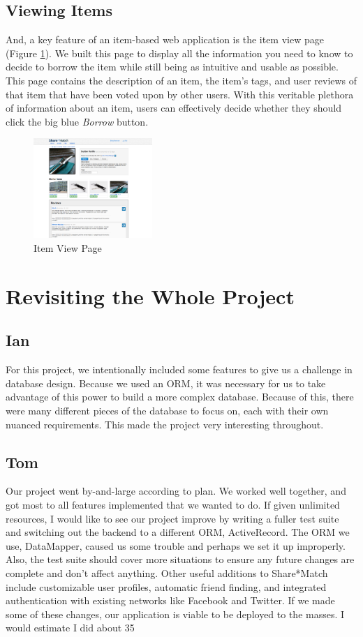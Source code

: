 \documentclass{acm_proc_article-sp}
\begin{document}
\subsection{Viewing Items}
And, a key feature of an item-based web application is the item view page (Figure \ref{fig:ItemView.png}). 
We built this page to display all the information
you need to know to decide to borrow the item while still being as intuitive and usable as possible. This page contains
the description of an item, the item's tags, and user reviews of that item that have been voted upon by other users.
With this veritable plethora of information about an item, users can effectively decide whether they should click the
big blue \textit{Borrow} button.

\begin{figure}[h]
\begin{centering}
\includegraphics[width=0.4\textwidth]{ItemView.png}
\caption{Item View Page}
\label{fig:ItemView.png}
\end{centering}
\end{figure}
\section{Revisiting the Whole Project}
\subsection{Ian}
For this project, we intentionally included some features to give us a challenge in database design. Because we used an ORM, it was necessary for us to take advantage of this power to build a more complex database. Because of this, there were many different pieces of the database to focus on, each with their own nuanced requirements. This made the project very interesting throughout.
\subsection{Tom}
Our project went by-and-large according to plan. We worked well together, and got most to all features implemented that we wanted to do.
If given unlimited resources, I would like to see our project improve by writing a fuller test suite and switching out the backend to a different ORM, ActiveRecord. The ORM we use, DataMapper, caused us some trouble and perhaps we set it up improperly. Also, the test suite should cover more situations to ensure any future changes are complete and don't affect anything.
Other useful additions to Share*Match include customizable user profiles, automatic friend finding, and integrated authentication with existing networks like Facebook and Twitter. If we made some of these changes, our application is viable to be deployed to the masses.
I would estimate I did about 35%
\end{document}
